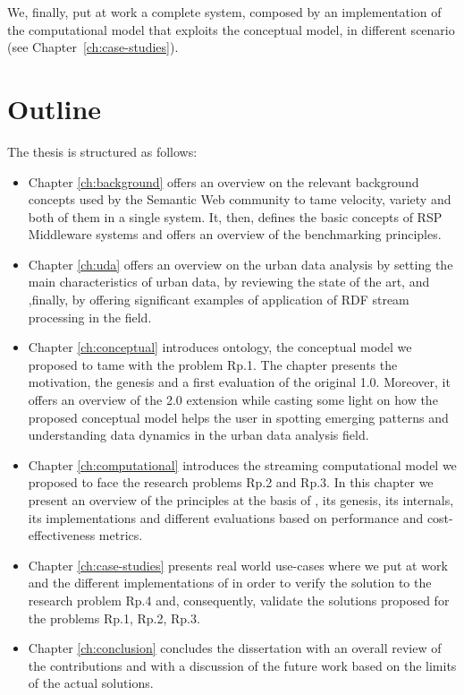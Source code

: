 We, finally, put at work a complete system, composed by an implementation of the computational model that exploits the conceptual model, in different scenario (see Chapter~\ref{ch:case-studies}).

\section{Outline}
The thesis is structured as follows:
\begin{itemize}
\item Chapter \ref{ch:background} offers an overview on the relevant background concepts used by the Semantic Web community to tame velocity, variety and both of them in a single system. It, then, defines the basic concepts of RSP Middleware systems and offers an overview of the benchmarking principles.

\item Chapter \ref{ch:uda} offers an overview on the urban data analysis by setting the main characteristics of urban data, by reviewing the state of the art, and ,finally, by offering significant examples of application of RDF stream processing in the field.

\item Chapter \ref{ch:conceptual} introduces \frappe{} ontology, the conceptual model we proposed to tame with the problem \textsf{Rp.1}. The chapter presents the motivation, the genesis and a first evaluation of the original \frappe{} 1.0. Moreover, it offers an overview of the \frappe{} 2.0 extension while casting some light on how the proposed conceptual model helps the user in spotting emerging patterns and understanding data dynamics in the urban data analysis field.

\item Chapter \ref{ch:computational} introduces \river{} the streaming computational model we proposed to face the research problems \textsf{Rp.2} and \textsf{Rp.3}. In this chapter we present an overview of the principles at the basis of \river{}, its genesis, its internals, its implementations and different evaluations based on performance and cost-effectiveness metrics.

\item Chapter \ref{ch:case-studies} presents real world use-cases where we put at work \frappe{} and the different implementations of \river{} in order to verify the solution to the research problem \textsf{Rp.4} and, consequently, validate the solutions proposed for the problems \textsf{Rp.1}, \textsf{Rp.2}, \textsf{Rp.3}. 

\item Chapter \ref{ch:conclusion} concludes the dissertation with an overall review of the contributions and with a discussion of the future work based on the limits of the actual solutions.
\end{itemize}

